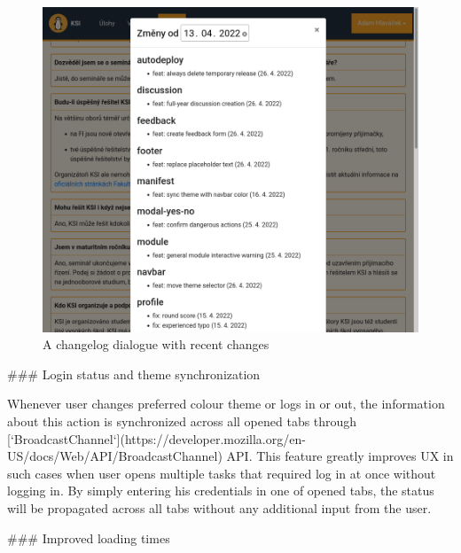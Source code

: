 \documentclass[
  digital, %
  oneside, %
  lof,     %
  nolot,     %
]{fithesis4}
\begin{document}
{\begin{figure}
\includegraphics[width=\textwidth]{assets/img/changelog}
\caption{A changelog dialogue with recent changes}
\label{fig:changelog}
\end{figure}

### Login status and theme synchronization

Whenever user changes preferred colour theme or logs in or out, the information about this action is synchronized across all opened tabs through [`BroadcastChannel`](https://developer.mozilla.org/en-US/docs/Web/API/BroadcastChannel) API. This feature greatly improves UX in such cases when user opens multiple tasks that required log in at once without logging in. By simply entering his credentials in one of opened tabs, the status will be propagated across all tabs without any additional input from the user.

### Improved loading times
\label{chap:faster}

}
\end{document}
